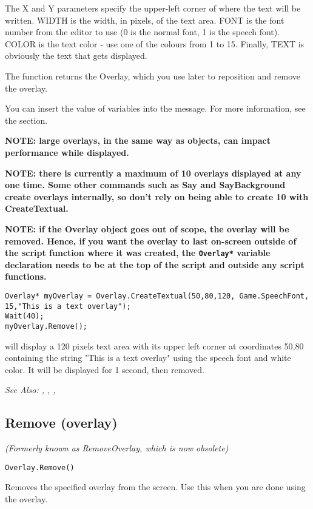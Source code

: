 The X and Y parameters specify the upper-left corner of where the text
will be written. WIDTH is the width, in pixels, of the text area. FONT is
the font number from the editor to use (0 is the normal font, 1 is the speech
font). COLOR is the text color - use one of the colours from 1 to 15.
Finally, TEXT is obviously the text that gets displayed.

The function returns the Overlay, which you use later to reposition
and remove the overlay.

You can insert the value of variables into the message. For more information,
see the  section.

\bf{NOTE:} large overlays, in the same way as objects, can impact performance
while displayed.

\bf{NOTE:} there is currently a maximum of 10 overlays displayed at any one time. Some other
commands such as Say and SayBackground create overlays internally,
so don't rely on being able to create 10 with CreateTextual.

\bf{NOTE:} if the Overlay object goes out of scope, the overlay will be removed. Hence,
if you want the overlay to last on-screen outside of the script function where it
was created, the \verb$Overlay*$ variable declaration needs to be at the top of
the script and outside any script functions.

\begin{verbatim}
Overlay* myOverlay = Overlay.CreateTextual(50,80,120, Game.SpeechFont, 15,"This is a text overlay");
Wait(40);
myOverlay.Remove();
\end{verbatim}
will display a 120 pixels text area with its upper left corner at coordinates 50,80
containing the string "This is a text overlay" using the speech font and white color.
It will be displayed for 1 second, then removed.

\it{See Also:} , ,
, 


\subsection{Remove (overlay)}\label{Overlay.Remove}%

\it{(Formerly known as RemoveOverlay, which is now obsolete)}

\begin{verbatim}
Overlay.Remove()
\end{verbatim}
Removes the specified overlay from the screen. Use this when you are
done using the overlay.

